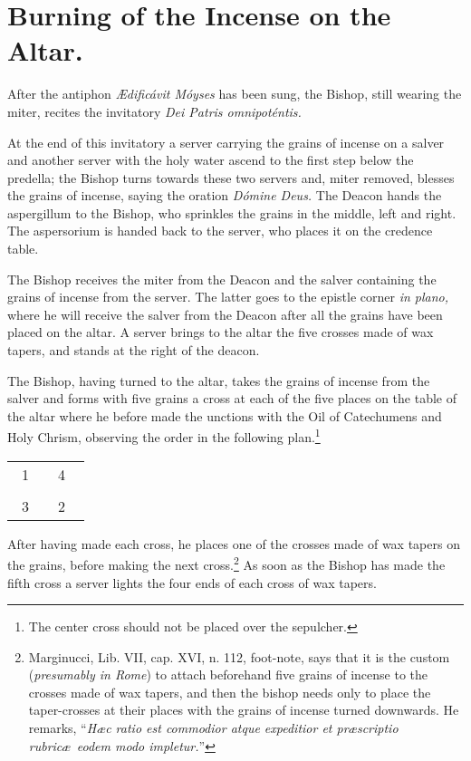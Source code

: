 \documentclass[letterpaper]{report}
\newcommand\crossplan{
\begin{center}
    \begin{tabular}{ | l c r | }
       \hline
        \cross\ {\tiny 1} &         & {\tiny 4} \cross\ \\
                           & \cross &           \\
        \cross\ {\tiny 3} &         & {\tiny 2} \cross\ \\
       \hline
   \end{tabular} 
\end{center}
}
\begin{document}
{    \section{Burning of the Incense on the Altar.}

    \rubric After the antiphon \textit{\AE dificávit Móyses} has been sung, the
    Bishop, still wearing the miter, recites the invitatory \textit{Dei Patris
    omnipoténtis.}

    \rubric At the end of this invitatory a server carrying the grains of
    incense on a salver and another server with the holy water ascend to the
    first step below the predella; the Bishop turns towards these two servers
    and, miter removed, blesses the grains of incense, saying the oration
    \textit{Dómine Deus.} The Deacon hands the aspergillum to the Bishop, who
    sprinkles the grains in the middle, left and right. The aspersorium is
    handed back to the server, who places it on the credence table.

    \rubric The Bishop receives the miter from the Deacon and the salver
    containing the grains of incense from the server. The latter goes to the
    epistle corner \textit{in plano,} where he will receive the salver from the
    Deacon after all the grains have been placed on the altar. A server brings
    to the altar the five crosses made of wax tapers, and stands at the right
    of the deacon.

    \rubric The Bishop, having turned to the altar, takes the grains of incense
    from the salver and forms with five grains a cross at each of the five
    places on the table of the altar where he before made the unctions with the
    Oil of Catechumens and Holy Chrism, observing the order in the following
    plan.\footnote{The center cross should not be placed over the sepulcher.}

    \crossplan

    After having made each cross, he places one of the crosses made of wax
    tapers on the grains, before making the next cross.\footnote{Marginucci,
    Lib. VII, cap. XVI, n. 112, foot-note, says that it is the custom
    (\textit{presumably in Rome}) to attach beforehand five grains of incense
    to the crosses made of wax tapers, and then the bishop needs only to place
    the taper-crosses at their places with the grains of incense turned
    downwards. He remarks, ``\textit{H\ae c ratio est commodior atque
    expeditior et pr\ae scriptio rubric\ae\ eodem modo impletur.}''} As soon as
    the Bishop has made the fifth cross a server lights the four ends of each
    cross of wax tapers.

}
\end{document}
